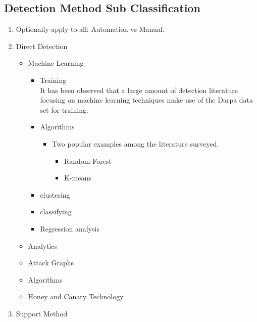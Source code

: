 \subsection{Detection Method Sub Classification}
\begin{enumerate}
    \item Optionally apply to all: Automation vs Manual.
    \item Direct Detection
        \begin{itemize}
            \item Machine Learning\cite{buczak2016survey}\cite{dua2016data} 
            \begin{itemize}
                \item Training\\
                It has been observed that a large amount of detection literature focusing on machine learning techniques make use of the Darpa data set for training. 
                \item Algorithms
                \begin{itemize}
                    \item Two popular examples among the literature surveyed.
                    \begin{itemize}
                        \item Random Forest \cite{singh2014big}
                        \item K-means\cite{asif2011filtering}\cite{hajamydeen2016unsupervised}
                    \end{itemize}
                \end{itemize}
                \item clustering \cite{asif2011filtering}   
                \item classifying
                \item Regression analysis
            \end{itemize}
            \item Analytics\cite{cardenas2013big}
                \item Attack Graphs\cite{abraham2015predictive}
                \item Algorithms\cite{kim2013detection}
            \item Honey and Canary Technology \cite{jasek2013apt}\cite{saud2015towards}
        \end{itemize}
    \item Support Method
        \begin{itemize}

\end{itemize}
\end{enumerate}

